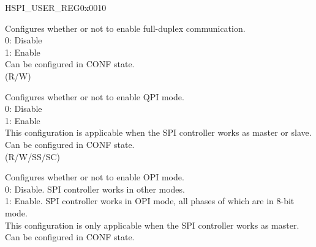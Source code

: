 \begin{register}{H}{SPI\_USER\_REG}{0x0010}\label{regdesc:SPIUSERREG}
%
%
%
%
%
%
%
%
%
%
%
%
%
%
%
%
%
%
%
%
%
%
%
%
%
\regnewline%
\begin{regdesc}\begin{reglist}
\label{fielddesc:SPIDOUTDIN}\item [SPI\_DOUTDIN] Configures whether or not to enable full-duplex communication. \\
0: Disable \\
1: Enable \\
Can be configured in CONF state. \\
(R/W)
\label{fielddesc:SPIQPIMODE}\item [SPI\_QPI\_MODE] Configures whether or not to enable QPI mode. \\
0: Disable \\
1: Enable \\
This configuration is applicable when the SPI controller works as master or slave. Can be configured in CONF state. \\
(R/W/SS/SC)
\label{fielddesc:SPIOPIMODE}\item [SPI\_OPI\_MODE] Configures whether or not to enable OPI mode.\\
0: Disable. SPI controller works in other modes.\\
1: Enable. SPI controller works in OPI mode, all phases of which are in 8-bit mode.\\
This configuration is only applicable when the SPI controller works as master. Can be configured in CONF state. \\

\end{reglist}
\end{regdesc}
\end{register}
